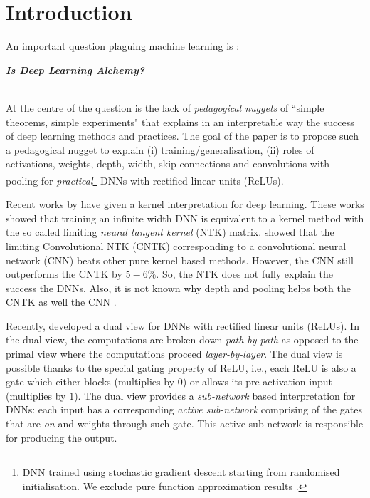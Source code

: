 \section{Introduction}\label{sec:intro}
An important question plaguing machine learning is \citet{BenAli-1,Lecun,BenAli-2,Aliresponse,Mickens}:\\
{\centerline{\textbf{\emph{Is Deep Learning Alchemy?}}}}\\
At the centre of the question is the lack of \emph{pedagogical nuggets} of ``simple theorems, simple experiments" \citet{Aliresponse} that explains in an interpretable way the success of deep learning methods and practices. The goal of the paper is to propose such a pedagogical nugget to explain (i) training/generalisation, (ii) roles of activations, weights, depth, width, skip connections and convolutions with pooling for \emph{practical}\footnote{DNN trained using stochastic gradient descent starting from randomised initialisation. We exclude pure function approximation results \cite{depth1,depth2}.} DNNs with rectified linear units (ReLUs). %

Recent works by \citet{arora2019exact, ntk,cao2019generalization} have given a kernel interpretation for deep learning. These works showed that training an infinite width DNN is equivalent to a kernel method with the so called limiting \emph{neural tangent kernel} (NTK) matrix. \citet{arora2019exact} showed that the limiting Convolutional NTK (CNTK) corresponding to a convolutional neural network (CNN) beats other pure kernel based methods. However, the CNN still outperforms the CNTK by $5-6\%$. So, the NTK does not fully explain the success the DNNs. Also, it is not known why depth and pooling helps both the CNTK as well the CNN \citet{arora2019exact}.

Recently, \citet{npk} developed a dual view for DNNs with rectified linear units (ReLUs). In the dual view, the computations are broken down \emph{path-by-path} as opposed to the primal view where the computations proceed \emph{layer-by-layer}. The dual view is possible thanks to the special gating property of ReLU, i.e., each ReLU is also a gate which either blocks (multiplies by $0$) or allows its pre-activation input (multiplies by $1$). The dual view provides a \emph{sub-network} based interpretation for DNNs: each input has a corresponding \emph{active sub-network} comprising of the gates that are \emph{on} and weights through such gate. This active sub-network is responsible for producing the output. 

